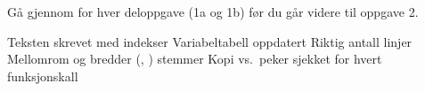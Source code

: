 
\label{kap:sjekk1}

Gå gjennom for hver deloppgave (1a og 1b) før du går videre til oppgave 2.\par
\boks Teksten skrevet med indekser \quad \boks Variabeltabell oppdatert \quad \boks Riktig antall linjer\\
\boks Mellomrom og bredder (, ) stemmer \quad \boks Kopi vs.\ peker sjekket for hvert funksjonskall
